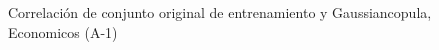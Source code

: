 \begin{figure}[H]
    \centering
    
    \caption{Correlación de conjunto original de entrenamiento y Gaussiancopula, Economicos (A-1)}
    \label{pairwise-economicos-a-1-gaussiancopula}
\end{figure}